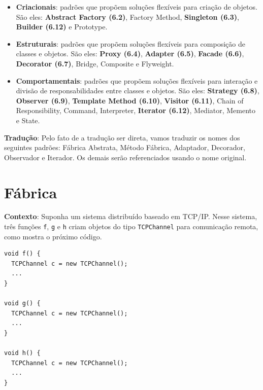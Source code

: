 \documentclass[
  11pt,
  twoside]{book}
\newcommand{\passthrough}[1]{#1}
\begin{document}
\begin{itemize}
\item
  \textbf{Criacionais}: padrões 
  que propõem soluções flexíveis para criação de objetos. São eles:
  \textbf{Abstract Factory (6.2)}, Factory Method, \textbf{Singleton
  (6.3)}, \textbf{Builder (6.12)} e Prototype.
\item
  \textbf{Estruturais}:  padrões
  que propõem soluções flexíveis para composição de classes e objetos.
  São eles: \textbf{Proxy (6.4)}, \textbf{Adapter (6.5)}, \textbf{Facade
  (6.6)}, \textbf{Decorator (6.7)}, Bridge, Composite e Flyweight.
\item
  \textbf{Comportamentais}: padrões
   que propõem soluções
  flexíveis para interação e divisão de responsabilidades entre classes
  e objetos. São eles: \textbf{Strategy (6.8)}, \textbf{Observer (6.9)},
  \textbf{Template Method (6.10)}, \textbf{Visitor (6.11)}, Chain of
  Responsibility, Command, Interpreter, \textbf{Iterator (6.12)},
  Mediator, Memento e State.
\end{itemize}

\textbf{Tradução}: Pelo fato de a tradução ser direta, vamos traduzir os
nomes dos seguintes padrões: Fábrica Abstrata, Método Fábrica,
Adaptador, Decorador, Observador e Iterador. Os demais serão
referenciados usando o nome original.

\hypertarget{fuxe1brica}{%
\section{Fábrica}\label{fuxe1brica}}

 

\textbf{Contexto}: Suponha um sistema distribuído baseado em TCP/IP.
Nesse sistema, três funções \passthrough{\lstinline!f!},
\passthrough{\lstinline!g!} e \passthrough{\lstinline!h!} criam objetos
do tipo \passthrough{\lstinline!TCPChannel!} para comunicação remota,
como mostra o próximo código.

\begin{lstlisting}
void f() {
  TCPChannel c = new TCPChannel();  
  ...
}

void g() {
  TCPChannel c = new TCPChannel();
  ...
}

void h() {
  TCPChannel c = new TCPChannel();
  ...
}
\end{lstlisting}
\end{document}
